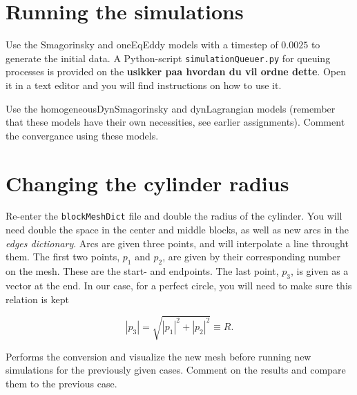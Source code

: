 \documentclass[a4paper,english,12pt]{article}
\begin{document}
\section*{Running the simulations}

Use the Smagorinsky and oneEqEddy models with a timestep of $0.0025$ to generate the initial data. A Python-script \verb+simulationQueuer.py+ for queuing processes is provided on the 
\textbf{usikker paa hvordan du vil ordne dette}. Open it in a text editor and you will find instructions on how to use it. 

Use the homogeneousDynSmagorinsky and dynLagrangian models (remember that these models have their own necessities, see earlier assignments). Comment the convergance using these models. 

\section*{Changing the cylinder radius}

Re-enter the \verb+blockMeshDict+ file and double the radius of the cylinder. You will need double the space in the center and middle blocks, as well as new arcs in the 
\textit{edges dictionary}. Arcs are given three points, and will interpolate a line throught them. The first two points, $p_1$ and $p_2$, are given by their corresponding number on the mesh. 
These are the start- and endpoints. The last point, $p_3$, is given as a vector at the end. In our case, for a perfect circle, you will need to make sure this relation is kept

\[
 |p_3| = \sqrt{|p_1|^2 + |p_2|^2} \equiv R.
\]
  

Performs the conversion and visualize the new mesh before running new simulations for the previously given cases. Comment on the results and compare them to the previous case.
\end{document}
